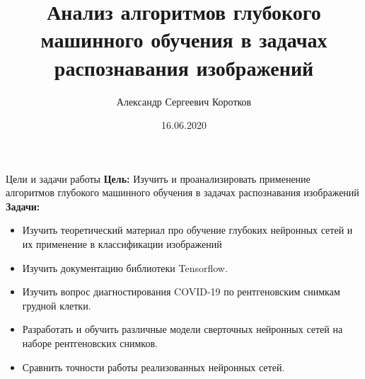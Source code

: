 \documentclass{beamer}
\title{Анализ алгоритмов глубокого машинного обучения  в задачах распознавания изображений}
\author[Коротков А.С.]{Александр Сергеевич Коротков}
\institute[]{Научный руководитель: Д.\,В.~Матвеев}
\date{16.06.2020}
\begin{document}
\maketitle
\begin{frame}{Цели и задачи работы}
    \textbf{Цель:} Изучить и проанализировать применение алгоритмов глубокого машинного обучения в задачах распознавания изображений \\
    \textbf{Задачи: }
    \begin{itemize}
        \item Изучить теоретический материал про обучение глубоких нейронных сетей и их применение в классификации изображений
        \item Изучить документацию библиотеки Tensorflow.
        \item Изучить вопрос диагностирования COVID-19 по рентгеновским снимкам грудной клетки.
        \item Разработать и обучить различные модели сверточных нейронных сетей на наборе рентгеновских снимков.
        \item Сравнить точности работы реализованных нейронных сетей.
    \end{itemize}
\end{frame}
\end{document}

